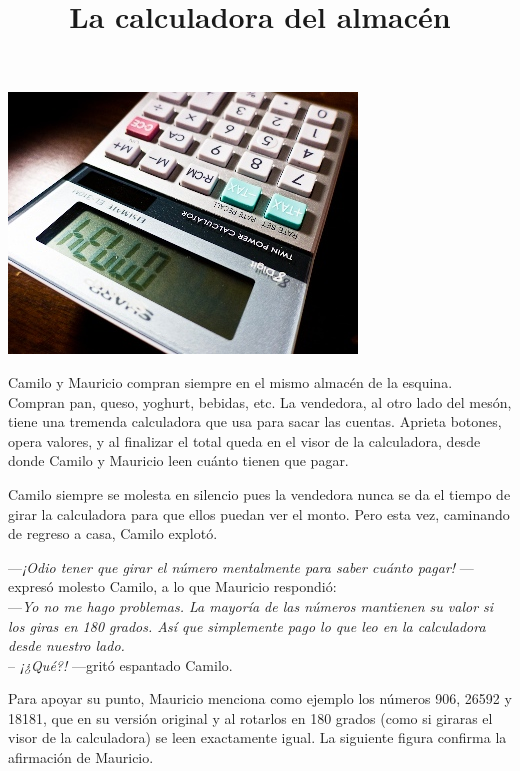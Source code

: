\documentclass{oci}
\title{La calculadora del almacén}
\begin{document}
\begin{problemDescription}

  \centerline{\includegraphics[scale=0.5]{upside-down.jpg}}


Camilo y Mauricio compran siempre en el mismo almacén de la esquina. %
Compran pan, queso, yoghurt, bebidas, etc. 
La vendedora, al otro lado del mesón, tiene una tremenda calculadora que usa para sacar las cuentas. 
Aprieta botones, opera valores, y al finalizar el total queda en el visor de la calculadora, 
desde donde Camilo y Mauricio leen cuánto tienen que pagar.

Camilo siempre se molesta en silencio pues la vendedora nunca se da el tiempo de girar la calculadora para que ellos puedan ver el monto.
Pero esta vez, caminando de regreso a casa, Camilo explotó.

---\emph{¡Odio tener que girar el número mentalmente para saber cuánto pagar!} ---expresó molesto Camilo, a lo que Mauricio respondió: \\
---\emph{Yo no me hago problemas. La mayoría de las números mantienen su valor si los giras en 180 grados. Así que simplemente pago lo que leo en la calculadora desde nuestro lado.} \\
-- \emph{¡¿Qué?!} ---gritó espantado Camilo.

Para apoyar su punto, Mauricio menciona como ejemplo los números 906, 26592 y
18181, que en su versión original y al rotarlos en 180 grados (como si giraras
el visor de la calculadora) se leen exactamente igual. La siguiente figura
confirma la afirmación de Mauricio.

\bigskip
\bigskip

\begin{center}
\resizebox{!}{40pt}{} \hspace*{50pt}  
\resizebox{!}{40pt}{} \hspace*{50pt}  
\resizebox{!}{40pt}{}\bigskip


\end{center}
\end{problemDescription}
\end{document}
